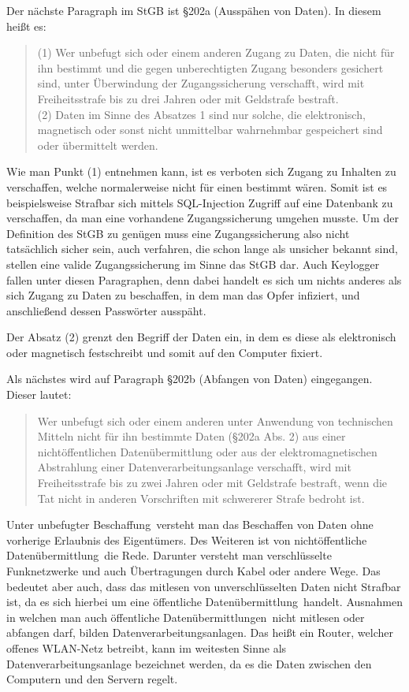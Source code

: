 \documentclass[10pt,a4paper]{article}
\begin{document}
Der nächste Paragraph im StGB ist §202a (Ausspähen von Daten). In diesem heißt es:
\begin{quote}
(1) Wer unbefugt sich oder einem anderen Zugang zu Daten, die nicht für ihn bestimmt und die gegen unberechtigten Zugang besonders gesichert sind, unter Überwindung der Zugangssicherung verschafft, wird mit Freiheitsstrafe bis zu drei Jahren oder mit Geldstrafe bestraft.\\
(2) Daten im Sinne des Absatzes 1 sind nur solche, die elektronisch, magnetisch oder sonst nicht unmittelbar wahrnehmbar gespeichert sind oder übermittelt werden.
\end{quote}

Wie man Punkt (1) entnehmen kann, ist es verboten sich Zugang zu Inhalten zu verschaffen, welche normalerweise nicht für einen bestimmt wären. Somit ist es beispielsweise Strafbar sich mittels SQL-Injection Zugriff auf eine Datenbank zu verschaffen, da man eine vorhandene Zugangssicherung umgehen musste. Um der Definition des StGB zu genügen muss eine Zugangssicherung also nicht tatsächlich sicher sein, auch verfahren, die schon lange als unsicher bekannt sind, stellen eine valide Zugangssicherung im Sinne das StGB dar. Auch Keylogger fallen unter diesen Paragraphen, denn dabei handelt es sich um nichts anderes als sich Zugang zu Daten zu beschaffen, in dem man das Opfer infiziert, und anschließend dessen Passwörter ausspäht. 

Der Absatz (2) grenzt den Begriff der Daten ein, in dem es diese als elektronisch oder magnetisch festschreibt und somit auf den Computer fixiert. 

Als nächstes wird auf Paragraph §202b (Abfangen von Daten) eingegangen. Dieser lautet:
\begin{quote}
Wer unbefugt sich oder einem anderen unter Anwendung von technischen Mitteln nicht für ihn bestimmte Daten (§202a Abs. 2) aus einer nichtöffentlichen Datenübermittlung oder aus der elektromagnetischen Abstrahlung einer Datenverarbeitungsanlage verschafft, wird mit Freiheitsstrafe bis zu zwei Jahren oder mit Geldstrafe bestraft, wenn die Tat nicht in anderen Vorschriften mit schwererer Strafe bedroht ist.
\end{quote}
Unter \glqq unbefugter Beschaffung\grqq \ versteht man das Beschaffen von Daten ohne vorherige Erlaubnis des Eigentümers. Des Weiteren ist von \glqq nichtöffentliche Datenübermittlung\grqq\ die Rede. Darunter versteht man verschlüsselte Funknetzwerke und auch Übertragungen durch Kabel oder andere Wege. Das bedeutet aber auch, dass das mitlesen von unverschlüsselten Daten nicht Strafbar ist, da es sich hierbei um eine \glqq öffentliche Datenübermittlung\grqq \ handelt. Ausnahmen in welchen man auch \glqq öffentliche Datenübermittlungen\grqq \  nicht mitlesen oder abfangen darf, bilden Datenverarbeitungsanlagen. Das heißt ein Router, welcher offenes WLAN-Netz betreibt, kann im weitesten Sinne als Datenverarbeitungsanlage bezeichnet werden, da es die Daten zwischen den Computern und den Servern regelt.
\end{document}
